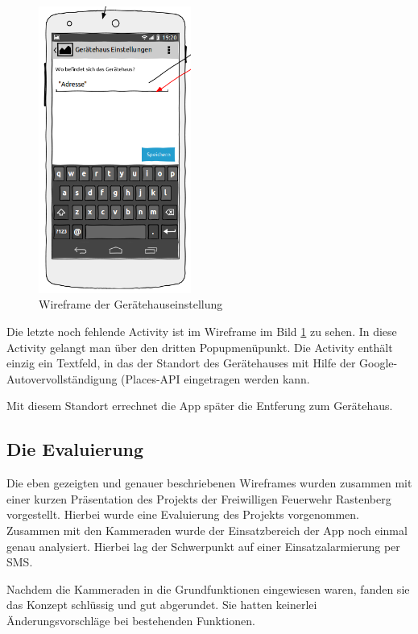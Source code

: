 \begin{figure}
\vspace{-13pt}
\includegraphics[width=5cm]{Bilder/WireframeGeraetehaus.png}
\caption{Wireframe der Ger\"atehauseinstellung}
\label{Wireframe Geraetehaus}
\vspace{-250pt}
\end{figure}
Die letzte noch fehlende Activity ist im Wireframe im Bild \ref{Wireframe Geraetehaus} zu sehen. In diese Activity gelangt man \"uber den dritten Popupmen\"upunkt. Die Activity enth\"alt einzig ein Textfeld, in das der Standort des Ger\"atehauses mit Hilfe der Google-Autovervollst\"andigung (Places-\ac{API} eingetragen werden kann.

Mit diesem Standort errechnet die App sp\"ater die Entferung zum Ger\"atehaus.
\newpage

\subsection{Die Evaluierung}
Die eben gezeigten und genauer beschriebenen Wireframes wurden zusammen mit einer kurzen Pr\"asentation des Projekts der Freiwilligen Feuerwehr Rastenberg vorgestellt.
Hierbei wurde eine Evaluierung des Projekts vorgenommen. Zusammen mit den Kammeraden wurde der Einsatzbereich der App noch einmal genau analysiert. Hierbei lag der Schwerpunkt auf einer Einsatzalarmierung per SMS. 

Nachdem die Kammeraden in die Grundfunktionen eingewiesen waren, fanden sie das Konzept schl\"ussig und gut abgerundet. Sie hatten keinerlei \"Anderungsvorschl\"age bei bestehenden Funktionen. 

